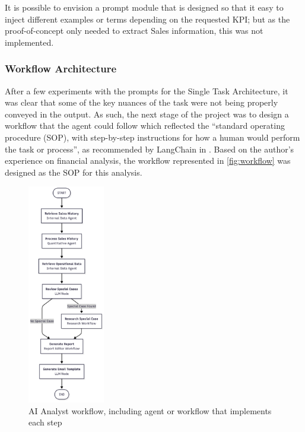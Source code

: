 \documentclass[a4paper]{report}
\begin{document}
It is possible to envision a prompt module that is designed so that it easy to inject different examples or terms depending on the requested KPI; but as the proof-of-concept only needed to extract Sales information, this was not implemented.

\subsubsection{Workflow Architecture}

After a few experiments with the prompts for the Single Task Architecture, it was clear that some of the key nuances of the task were not being properly conveyed in the output. As such, the next stage of the project was to design a workflow that the agent could follow which reflected the ``standard operating procedure (SOP), with step-by-step instructions for how a human would perform the task or process'', as recommended by LangChain in \cite{langchain2025buildAgent}. Based on the author's experience on financial analysis, the workflow represented in \autoref{fig:workflow} was designed as the SOP for this analysis.

\begin{figure}[h]
\centering
\includegraphics[width=0.3\textwidth]{images/workflow.png}
\caption{AI Analyst workflow, including agent or workflow that implements each step}
\label{fig:workflow}
\end{figure}
\end{document}
